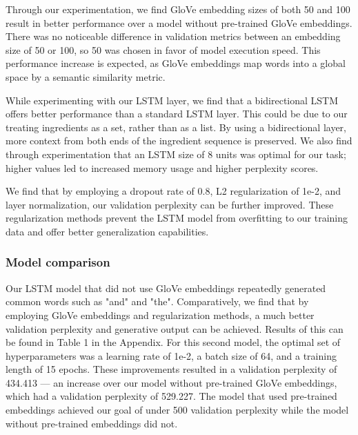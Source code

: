 \documentclass[10pt,twocolumn,letterpaper]{article}
\begin{document}
Through our experimentation, we find GloVe embedding sizes of both 50 and 100 result in better performance over a model without pre-trained GloVe embeddings. There was no noticeable difference in validation metrics between an embedding size of 50 or 100, so 50 was chosen in favor of model execution speed. This performance increase is expected, as GloVe embeddings map words into a global space by a semantic similarity metric.

While experimenting with our LSTM layer, we find that a bidirectional LSTM offers better performance than a standard LSTM layer. This could be due to our treating ingredients as a set, rather than as a list. By using a bidirectional layer, more context from both ends of the ingredient sequence is preserved. We also find through experimentation that an LSTM size of 8 units was optimal for our task; higher values led to increased memory usage and higher perplexity scores.

We find that by employing a dropout rate of 0.8, L2 regularization of 1e-2, and layer normalization, our validation perplexity can be further improved. These regularization methods prevent the LSTM model from overfitting to our training data and offer better generalization capabilities.

\subsubsection{Model comparison}

Our LSTM model that did not use GloVe embeddings repeatedly generated common words such as "and" and "the". Comparatively, we find that by employing GloVe embeddings and regularization methods, a much better validation perplexity and generative output can be achieved. Results of this can be found in Table 1 in the Appendix. For this second model, the optimal set of hyperparameters was a learning rate of 1e-2, a batch size of 64, and a training length of 15 epochs. These improvements resulted in a validation perplexity of 434.413 --- an increase over our model without pre-trained GloVe embeddings, which had a validation perplexity of 529.227. The model that used pre-trained embeddings achieved our goal of under 500 validation perplexity while the model without pre-trained embeddings did not.
\end{document}

